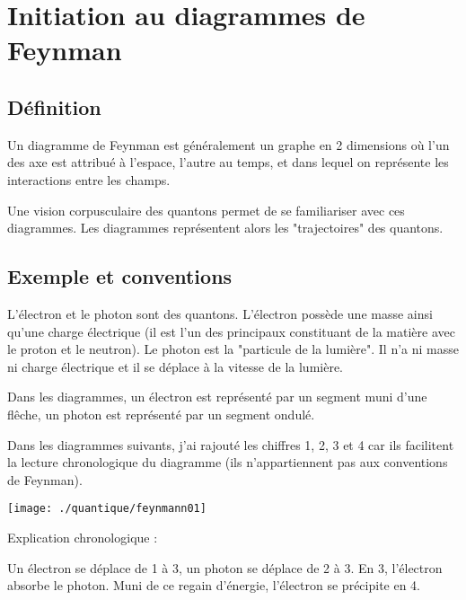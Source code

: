 

\section{Initiation au diagrammes de Feynman \cite{diagrammesFeynman}}


\label{JeanLucDeziel}

\subsection{Définition}

Un diagramme de Feynman est généralement un graphe en 2 dimensions où l'un des axe est attribué à l'espace, l'autre au temps, et dans lequel on représente les interactions entre les champs.



Une vision corpusculaire des quantons permet de se familiariser avec ces diagrammes. Les diagrammes représentent alors les "trajectoires" des quantons.

\subsection{Exemple et conventions}

L'électron et le photon sont des quantons. L'électron possède une masse ainsi qu'une charge électrique (il est l'un des principaux constituant de la matière avec le proton et le neutron). Le photon est la "particule de la lumière". Il n'a ni masse ni charge électrique et il se déplace à la vitesse de la lumière.

Dans les diagrammes, un électron est représenté par un segment muni d'une flêche, un photon est représenté par un segment ondulé.

Dans les diagrammes suivants, j'ai rajouté les chiffres 1, 2, 3 et 4 car ils facilitent la lecture chronologique du diagramme (ils n'appartiennent pas aux conventions de Feynman).

\vspace{0.9cm}
\begin{minipage}[c]{.45\linewidth}
\texttt{[image: ./quantique/feynmann01]}
\end{minipage}
\hfill
\begin{minipage}[c]{.45\linewidth}
\begin{center}
Explication chronologique :
\end{center}
Un électron se déplace de 1 à 3, un photon se déplace de 2 à 3. En 3, l'électron absorbe le photon. Muni de ce regain d'énergie, l'électron se précipite en 4.
\end{minipage}


